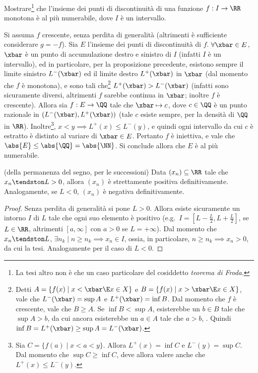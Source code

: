 \documentclass[11pt]{article}
\begin{document}
	\begin{exercise}
		Mostrare\footnote{La tesi altro non è che un caso particolare del cosiddetto \textit{teorema di Froda}.} che l'insieme dei punti di discontinuità di una funzione $f : I \to \RR$ monotona è al più
		numerabile, dove $I$ è un intervallo.
	\end{exercise}

	\begin{solution}
		Si assuma $f$ crescente, senza perdita di generalità (altrimenti è sufficiente considerare $g = -f$).
		Sia $E$ l'insieme dei punti di discontinuità di $f$. $\forall \xbar \in E$, $\xbar$ è un punto di accumulazione
		destro e sinistro di $I$ (infatti $I$ è un intervallo), ed in particolare, per la proposizione precedente, esistono sempre il limite sinistro $L^-(\xbar)$
		ed il limite destro $L^+(\xbar)$ in $\xbar$ (dal momento che $f$ è monotona), e sono tali che\footnote{Detti
		$A = \{f(x) \mid x < \xbar \E x \in X\}$ e $B = \{f(x) \mid x > \xbar \E x \in X\}$, vale che $L^-(\xbar) = \sup A$ e $L^+(\xbar) = \inf B$. Dal momento che $f$ è crescente, vale che $B \geq A$. Se $\inf B < \sup A$, esisterebbe un $b \in B$ tale che $\sup A > b$, da cui ancora
		esisterebbe un $a \in A$ tale che $a > b$, \Lightning. Quindi
		$\inf B = L^+(\xbar) \geq \sup A = L^-(\xbar)$.}  $L^+(\xbar) > L^-(\xbar)$ (infatti
		sono sicuramente diversi, altrimenti
		$f$ sarebbe continua in $\xbar$; inoltre $f$ è crescente). Allora sia $f : E \to \QQ$ tale che $\xbar \mapsto c$, dove $c \in \QQ$ è
		un punto razionale in $(L^-(\xbar), L^+(\xbar))$ (tale $c$ esiste sempre, per la densità di $\QQ$ in $\RR$).
		Inoltre\footnote{Sia $C = \{f(a) \mid x < a < y \}$. Allora $L^+(x) = \inf C$ e $L^-(y) = \sup C$.
		Dal momento che $\sup C \geq \inf C$, deve allora valere anche
		che $L^+(x) \leq L^-(y)$.}, $x < y \implies L^+(x) \leq L^-(y)$, e quindi ogni intervallo da cui $c$ è estratto è distinto al variare
		di $\xbar \in E$. Pertanto $f$ è iniettiva, e vale che $\abs{E} \leq \abs{\QQ} = \abs{\NN}$. Si conclude allora
		che $E$ è al più numerabile.
	\end{solution}
	
	\begin{theorem} (della permanenza del segno, per le successioni)
		Data $(x_n) \subseteq \RR$ tale che $x_n \tendston L > 0$, allora
		$(x_n)$ è strettamente positiva definitivamente. Analogamente, se $L < 0$,
		$(x_n)$ è negativa definitivamente.
	\end{theorem}

	\begin{proof}
		Senza perdita di generalità si pone $L > 0$. Allora esiste sicuramente un intorno $I$ di $L$ tale che ogni suo elemento è positivo (e.g.~$I = \left[L - \frac{L}{2}, L + \frac{L}{2}\right]$, se $L \in \RR$, altrimenti $[a, \infty]$ con $a > 0$ se $L = +\infty$). Dal momento che $x_n \tendston L$, $\exists n_k \mid n \geq n_k \implies x_n \in I$,
		ossia, in particolare, $n \geq n_k \implies x_n > 0$, da cui la tesi. Analogamente per il caso di $L < 0$.
	\end{proof}
\end{document}
